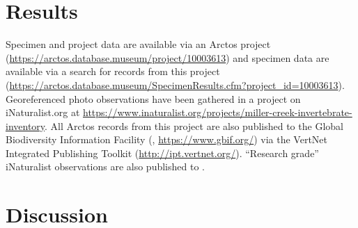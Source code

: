 \section{Results}

Specimen and project data are available via an Arctos project (\url{https://arctos.database.museum/project/10003613}) and specimen data are available via a search for records from this project (\url{https://arctos.database.museum/SpecimenResults.cfm?project_id=10003613}). Georeferenced photo observations have been gathered in a project on iNaturalist.org at \url{https://www.inaturalist.org/projects/miller-creek-invertebrate-inventory}. All Arctos records from this project are also published to the Global Biodiversity Information Facility (, \url{https://www.gbif.org/}) via the VertNet Integrated Publishing Toolkit (\url{http://ipt.vertnet.org/}). ``Research grade'' iNaturalist observations are also published to .

\section{Discussion}




